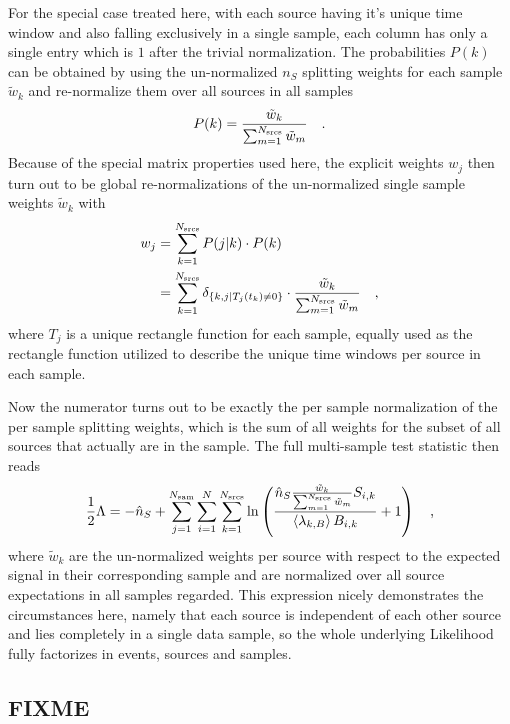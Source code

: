 For the special case treated here, with each source having it's unique time window and also falling exclusively in a single sample, each column has only a single entry which is $1$ after the trivial normalization. 
The probabilities $P(k)$ can be obtained by using the un-normalized $n_S$ splitting weights for each sample $\tilde{w}_k$ and re-normalize them over all sources in all samples
\begin{equation}
  P(k) = \frac{\tilde{w}_k}{\sum_{m=1}^{N_\text{srcs}} \tilde{w}_m}
  \quad\text{.}
\end{equation}
Because of the special matrix properties used here, the explicit weights $w_j$ then turn out to be global re-normalizations of the un-normalized single sample weights $\tilde{w}_k$ with
\begin{align}
  w_j
    &= \sum_{k=1}^{N_\text{srcs}} P(j|k)\cdot P(k) \\
    &= \sum_{k=1}^{N_\text{srcs}}
      \delta_{\{k,j|T_j(t_k)\neq 0\}} \cdot
      \frac{\tilde{w}_k}{\sum_{m=1}^{N_\text{srcs}} \tilde{w}_m}
  \quad\text{,}
\end{align}
where $T_j$ is a unique rectangle function for each sample, equally used as the rectangle function utilized to describe the unique time windows per source in each sample.

Now the numerator turns out to be exactly the per sample normalization of the per sample splitting weights, which is the sum of all weights for the subset of all sources that actually are in the sample.
The full multi-sample test statistic then reads
\begin{equation}
  \frac{1}{2}\Lambda
  = -\hat{n}_S +
    \sum_{j=1}^{N_\text{sam}} \sum_{i=1}^N \sum_{k=1}^{N_\text{srcs}}
    \ln\left(
      \frac{
        \hat{n}_{S}
        \frac{\tilde{w}_k}{\sum_{m=1}^{N_\text{srcs}} \tilde{w}_m} S_{i,k}}
      {\Braket{\lambda_{k,B}} B_{i,k}} + 1 \right)
  \quad\text{,}
\end{equation}
where $\tilde{w}_k$ are the un-normalized weights per source with respect to the expected signal in their corresponding sample and are normalized over all source expectations in all samples regarded.
This expression nicely demonstrates the circumstances here, namely that each source is independent of each other source and lies completely in a single data sample, so the whole underlying Likelihood fully factorizes in events, sources and samples.

\subsection{FIXME}



